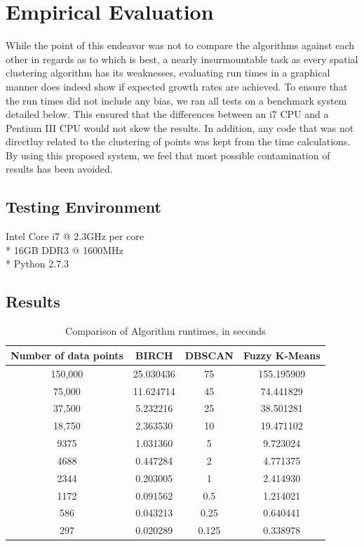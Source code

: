 \documentclass[conference, 10pt]{IEEEtran}
\begin{document}
\section{Empirical Evaluation}
While the point of this endeavor was not to compare the algorithms against each other in regards as to which is best, a nearly insurmountable task as every spatial clustering algorithm has its weaknesses, evaluating run times in a graphical manner does indeed show if expected growth rates are achieved. To ensure that the run times did not include any bias, we ran all tests on a benchmark system detailed below. This ensured that the differences between an i7 CPU and a Pentium III CPU would not skew the results. In addition, any code that was not directluy related to the clustering of points was kept from the time calculations. By using this proposed system, we feel that most possible contamination of results has been avoided.

\subsection{Testing Environment}
\begin{center}
Intel Core i7 @ 2.3GHz per core\\*
16GB DDR3 @ 1600MHz\\*
Python 2.7.3
\end{center}

\subsection{Results}

\begin{table}[h]
\begin{center}
\caption{Comparison of Algorithm runtimes, in seconds} \label{Table1Label}
\begin{tabular}{|c|c|c|c|}
 \hline
 Number of data points & BIRCH & DBSCAN& Fuzzy K-Means \\
 \hline
 150,000 & 25.030436 & 75 & 155.195909\\
 \hline
 75,000 & 11.624714 & 45 & 74.441829\\
 \hline
 37,500 & 5.232216 & 25 & 38.501281\\
 \hline
 18,750 & 2.363530 & 10 & 19.471102\\
 \hline
 9375 & 1.031360 & 5 & 9.723024\\
 \hline
 4688 & 0.447284 & 2 & 4.771375\\
 \hline
 2344 & 0.203005 & 1 & 2.414930\\
 \hline
 1172 & 0.091562 & 0.5 & 1.214021\\
 \hline
 586 & 0.043213 & 0.25 & 0.640441\\
 \hline
 297 & 0.020289 & 0.125 & 0.338978\\
 \hline
\end{tabular}
\end{center}
\end{table}
\end{document}
